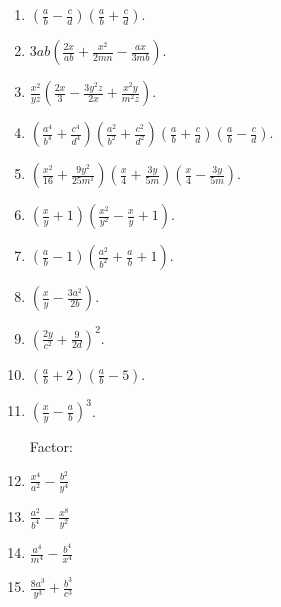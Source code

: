 \documentclass{book}
\begin{document}
\begin{enumerate}
\item$\displaystyle \left( \frac{a}{b} - \frac{c}{d} \right)
     \left( \frac{a}{b} + \frac{c}{d} \right)$.

\item $\displaystyle 3ab\left(\frac{2x}{ab}+ \frac{x^2}{2mn}-
\frac{ax}{3mb}\right)$.

\item $\displaystyle \frac{x^2}{yz}
  \left( \frac{2x}{3} - \frac{3y^2z}{2x} + \frac{x^2y}{m^2z} \right)$.

\item $\displaystyle \left( \frac{a^4}{b^4} + \frac{c^4}{d^4}
\right)
     \left( \frac{a^2}{b^2} + \frac{c^2}{d^2} \right)
     \left( \frac{ a }{ b } + \frac{ c }{ d } \right)
     \left( \frac{ a }{ b } - \frac{ c }{ d } \right)$.

\item $\displaystyle \left( \frac{x^2}{16} + \frac{9y^2}{25m^1}
\right)
     \left( \frac{x}{4} + \frac{3y}{5m} \right)
     \left( \frac{x}{4} - \frac{3y}{5m} \right)$.

\item $\displaystyle \left( \frac{x}{y} + 1 \right)
     \left( \frac{x^2}{y^2} - \frac{x}{y} + 1 \right)$.

\item $\displaystyle \left( \frac{a}{b} - 1 \right)
     \left( \frac{a^2}{b^2} + \frac{a}{b} + 1 \right)$.

\item $\displaystyle \left( \frac{x}{y} - \frac{3a^2}{2b}
\right)$.

\item $\displaystyle \left( \frac{2y}{c^2} + \frac{9}{2d}
\right)^2$.

\item $\displaystyle \left( \frac{a}{b} + 2 \right) \left(
\frac{a}{b} - 5 \right)$.

\item $\displaystyle \left( \frac{x}{y} - \frac{a}{b} \right)^3$.

Factor:

\item $\displaystyle \frac{x^4}{a^2} - \frac{b^2}{y^4}$

\item $\displaystyle \frac{a^2}{b^4} - \frac{x^8}{y^2}$

\item $\frac{a^4}{m^4} - \frac{b^4}{x^4}$

\item $\displaystyle \frac{8a^3}{y^3} + \frac{b^3}{c^3}$


\end{enumerate}
\end{document}
